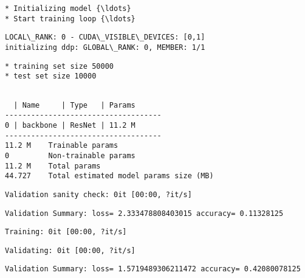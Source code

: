 \documentclass[11pt]{article}
\begin{document}
    \begin{Verbatim}[commandchars=\\\{\}]
* Initializing model {\ldots}
* Start training loop {\ldots}
    \end{Verbatim}

    \begin{Verbatim}[commandchars=\\\{\}]
LOCAL\_RANK: 0 - CUDA\_VISIBLE\_DEVICES: [0,1]
initializing ddp: GLOBAL\_RANK: 0, MEMBER: 1/1
    \end{Verbatim}

    \begin{Verbatim}[commandchars=\\\{\}]
* training set size 50000
* test set size 10000
    \end{Verbatim}

    \begin{Verbatim}[commandchars=\\\{\}]

  | Name     | Type   | Params
------------------------------------
0 | backbone | ResNet | 11.2 M
------------------------------------
11.2 M    Trainable params
0         Non-trainable params
11.2 M    Total params
44.727    Total estimated model params size (MB)
    \end{Verbatim}

    
    \begin{Verbatim}[commandchars=\\\{\}]
Validation sanity check: 0it [00:00, ?it/s]
    \end{Verbatim}

    
    \begin{Verbatim}[commandchars=\\\{\}]
Validation Summary: loss= 2.333478808403015 accuracy= 0.11328125
    \end{Verbatim}

    
    \begin{Verbatim}[commandchars=\\\{\}]
Training: 0it [00:00, ?it/s]
    \end{Verbatim}

    
    
    \begin{Verbatim}[commandchars=\\\{\}]
Validating: 0it [00:00, ?it/s]
    \end{Verbatim}

    
    \begin{Verbatim}[commandchars=\\\{\}]
Validation Summary: loss= 1.5719489306211472 accuracy= 0.42080078125
    \end{Verbatim}
\end{document}
